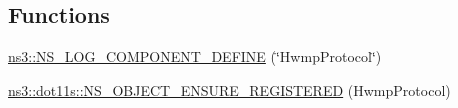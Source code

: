 \subsection*{Functions}
\begin{DoxyCompactItemize}
\item 
\hyperlink{namespacens3_a07ab6fdec3e35453bfaf96a87b677aa1}{ns3\+::\+N\+S\+\_\+\+L\+O\+G\+\_\+\+C\+O\+M\+P\+O\+N\+E\+N\+T\+\_\+\+D\+E\+F\+I\+NE} (\char`\"{}Hwmp\+Protocol\char`\"{})
\item 
\hyperlink{namespacens3_1_1dot11s_a08462663c2792f2a41db2c8da9a362f2}{ns3\+::dot11s\+::\+N\+S\+\_\+\+O\+B\+J\+E\+C\+T\+\_\+\+E\+N\+S\+U\+R\+E\+\_\+\+R\+E\+G\+I\+S\+T\+E\+R\+ED} (Hwmp\+Protocol)
\end{DoxyCompactItemize}
